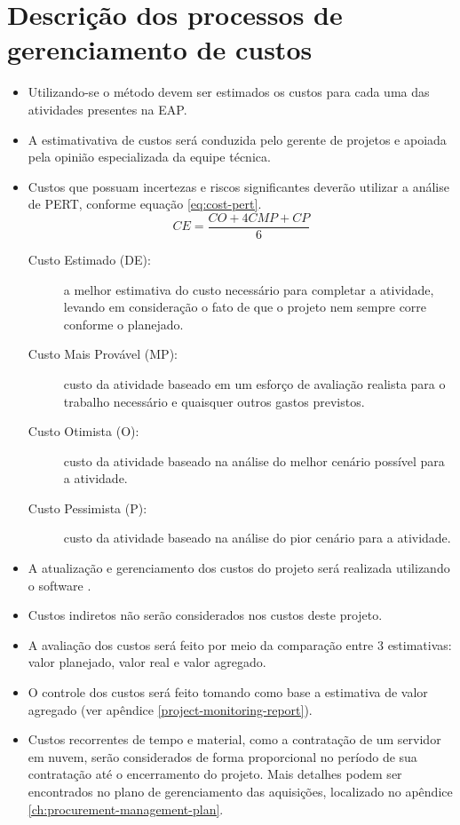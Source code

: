 \section{Descrição dos processos de gerenciamento de custos}

\begin{itemize}
	\item Utilizando-se o método  devem ser estimados os custos para cada uma das atividades presentes na EAP.
	\item A estimativativa de custos será conduzida pelo gerente de projetos e apoiada pela opinião especializada da equipe técnica.
	\item Custos que possuam incertezas e riscos significantes deverão utilizar a análise de PERT, conforme equação \ref{eq:cost-pert}.
	      \begin{equation}\label{eq:cost-pert}
		      CE = \frac{CO+4CMP+CP}{6}
	      \end{equation}
	      \begin{description}
		      \item[Custo Estimado (DE):] a melhor estimativa do custo necessário para completar a atividade, levando em consideração o fato de que o projeto nem sempre corre conforme o planejado.
		      \item[Custo Mais Provável (MP):] custo da atividade baseado em um esforço de avaliação realista para o trabalho necessário e quaisquer outros gastos previstos.
		      \item[Custo Otimista (O):] custo da atividade baseado na análise do melhor cenário possível para a atividade.
		      \item[Custo Pessimista (P):] custo da atividade baseado na análise do pior cenário para a atividade.
	      \end{description}
	\item A atualização e gerenciamento dos custos do projeto será realizada utilizando o software \projectManagementSoftwareName{}.
	\item Custos indiretos não serão considerados nos custos deste projeto.
	\item A avaliação dos custos será feito por meio da comparação entre 3 estimativas: valor planejado, valor real e valor agregado.
	\item O controle dos custos será feito tomando como base a estimativa de valor agregado (ver apêndice \ref{project-monitoring-report}).
	\item Custos recorrentes de tempo e material, como a contratação de um servidor em nuvem, serão considerados de forma proporcional no período de sua contratação até o encerramento do projeto. Mais detalhes podem ser encontrados no plano de gerenciamento das aquisições, localizado no apêndice \ref{ch:procurement-management-plan}.
\end{itemize}

